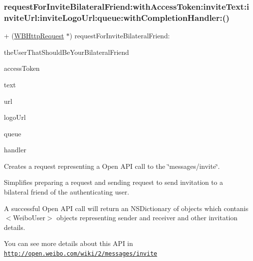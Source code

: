 \subsubsection{\texorpdfstring{request\+For\+Invite\+Bilateral\+Friend\+:with\+Access\+Token\+:invite\+Text\+:invite\+Url\+:invite\+Logo\+Url\+:queue\+:with\+Completion\+Handler\+:()}{requestForInviteBilateralFriend:withAccessToken:inviteText:inviteUrl:inviteLogoUrl:queue:withCompletionHandler:()}\hspace{0.1cm}{\footnotesize\ttfamily [2/3]}}
{\footnotesize\ttfamily + (\mbox{\hyperlink{interface_w_b_http_request}{W\+B\+Http\+Request}} $\ast$) request\+For\+Invite\+Bilateral\+Friend\+: \begin{DoxyParamCaption}\item[{(N\+S\+String $\ast$)}]{the\+User\+That\+Should\+Be\+Your\+Bilateral\+Friend }\item[{withAccessToken:(N\+S\+String $\ast$)}]{access\+Token }\item[{inviteText:(N\+S\+String $\ast$)}]{text }\item[{inviteUrl:(N\+S\+String $\ast$)}]{url }\item[{inviteLogoUrl:(N\+S\+String $\ast$)}]{logo\+Url }\item[{queue:(N\+S\+Operation\+Queue $\ast$)}]{queue }\item[{withCompletionHandler:(W\+B\+Request\+Handler)}]{handler }\end{DoxyParamCaption}}

Creates a request representing a Open A\+PI call to the \char`\"{}messages/invite\char`\"{}.

Simplifies preparing a request and sending request to send invitation to a bilateral friend of the authenticating user.

A successful Open A\+PI call will return an N\+S\+Dictionary of objects which contanis $<$\+Weibo\+User$>$ objects representing sender and receiver and other invitation details.

You can see more details about this A\+PI in \href{http://open.weibo.com/wiki/2/messages/invite}{\tt http\+://open.\+weibo.\+com/wiki/2/messages/invite}


